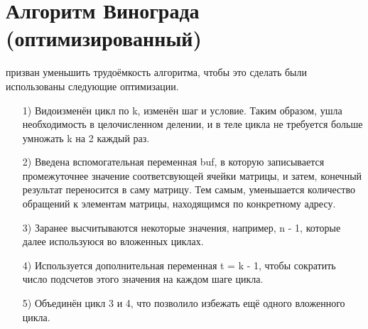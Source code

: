 \section{Алгоритм Винограда (оптимизированный)}
 призван уменьшить трудоёмкость алгоритма, чтобы это сделать были использованы следующие оптимизации.
\begin{enumerate}
	\item[1)]Видоизменён цикл по k, изменён шаг и условие. Таким образом, ушла необходимость в целочисленном делении, и в теле цикла не требуется больше умножать k на 2 каждый раз.
	\item[2)]Введена вспомогательная переменная buf, в которую записывается промежуточнее значение соответсвующей ячейки матрицы, и затем, конечный результат переносится в саму матрицу. Тем самым, уменьшается количество обращений к элементам матрицы, находящимся по конкретному адресу.
	\item[3)]Заранее высчитываются некоторые значения, например, n - 1, которые далее используюся во вложенных циклах.
	\item[4)]Используется дополнительная переменная t = k - 1, чтобы сократить число подсчетов этого значения на каждом шаге цикла. 
	\item[5)]Объединён цикл 3 и 4, что позволило избежать ещё одного вложенного цикла.
\end{enumerate}

